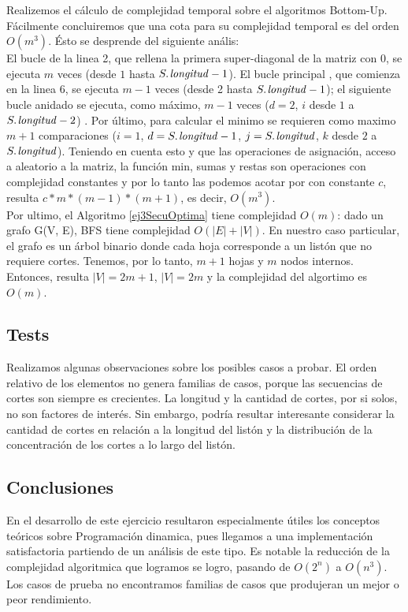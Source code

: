 Realizemos el c\'alculo de complejidad temporal sobre el algoritmos Bottom-Up. F\'acilmente concluiremos que una cota para su complejidad temporal es del orden $O(m^3)$. \' Esto se desprende del siguiente an\'alis:\\
El bucle de la linea 2, que rellena la primera super-diagonal de la matriz con $0$, se ejecuta $m$ veces (desde $1$ hasta $\attrib{S}{longitud}-1$).
El bucle principal , que comienza en la linea 6, se ejecuta $m-1$ veces (desde 2 hasta $\attrib{S}{longitud}-1$); el siguiente bucle  anidado se ejecuta, 
como m\'aximo, $m-1$ veces ($d = 2$, $i$ desde $1$ a $\attrib{S}{longitud}-2$) . Por \'ultimo, para calcular el minimo se requieren como maximo $m+1$ 
comparaciones ($i = 1$, $d = \attrib{S}{longitud}-1$, $j = \attrib{S}{longitud}$, $k$ desde $2$ a $\attrib{S}{longitud}$). Teniendo en cuenta esto y que las operaciones de 
asignaci\'on, acceso a aleatorio a la matriz, la funci\'on min, sumas y restas son operaciones con complejidad constantes 
y por lo tanto las podemos acotar por con constante $c$, resulta $c*m*(m-1)*(m+1)$, es decir, $O(m^3)$.\\

Por ultimo, el Algoritmo \ref{ej3SecuOptima} tiene complejidad $O(m)$: dado un grafo G(V, E), BFS tiene complejidad $O(|E| + |V|)$. En nuestro caso particular, el grafo es un \'arbol binario donde cada hoja corresponde a un list\'on que no requiere cortes. Tenemos, por lo tanto, $m+1$ hojas y $m$ nodos internos. Entonces, resulta $|V| = 2m+1$, $|V| = 2m$ y la complejidad del algortimo es $O(m)$.
\subsection{Tests}
Realizamos algunas observaciones sobre los posibles casos a probar.
El orden relativo de los elementos no genera familias de casos, porque las secuencias de cortes son siempre es crecientes. La longitud y la cantidad de cortes, por si solos, no son factores de inter\'es. Sin embargo, podr\'ia resultar interesante considerar la cantidad de cortes en relaci\'on a la longitud del list\'on y  la distribuci\'on de la concentraci\'on de los cortes a lo largo del list\'on.

\subsection{Conclusiones}
En el desarrollo de este ejercicio resultaron especialmente \'utiles los conceptos te\'oricos sobre Programaci\'on dinamica, pues llegamos a una implementaci\'on satisfactoria partiendo de un an\'alisis de este tipo. Es notable la reducci\'on de la complejidad algoritmica que logramos se logro, pasando de $O(2^n)$ a $O(n^3)$. Los casos de prueba no encontramos familias de casos que produjeran un mejor o peor rendimiento. 